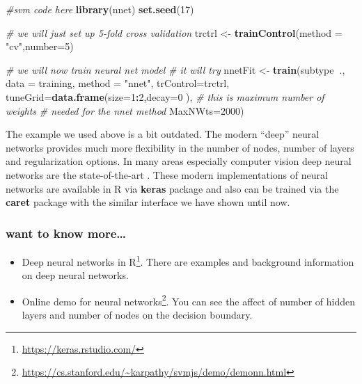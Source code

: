 \documentclass[12pt,]{krantz}
\newenvironment{Shaded}{\begin{snugshade}}{\end{snugshade}}
\newcommand{\CommentTok}[1]{\textcolor[rgb]{0.56,0.35,0.01}{\textit{#1}}}
\newcommand{\DataTypeTok}[1]{\textcolor[rgb]{0.13,0.29,0.53}{#1}}
\newcommand{\DecValTok}[1]{\textcolor[rgb]{0.00,0.00,0.81}{#1}}
\newcommand{\KeywordTok}[1]{\textcolor[rgb]{0.13,0.29,0.53}{\textbf{#1}}}
\newcommand{\NormalTok}[1]{#1}
\newcommand{\OperatorTok}[1]{\textcolor[rgb]{0.81,0.36,0.00}{\textbf{#1}}}
\newcommand{\StringTok}[1]{\textcolor[rgb]{0.31,0.60,0.02}{#1}}
\providecommand{\tightlist}{%
  \setlength{\itemsep}{0pt}\setlength{\parskip}{0pt}}
\renewcommand{\href}[2]{#2\footnote{\url{#1}}}
\begin{document}
\begin{Shaded}
\begin{Highlighting}[]
\CommentTok{#svm code here}
\KeywordTok{library}\NormalTok{(nnet)}
\KeywordTok{set.seed}\NormalTok{(}\DecValTok{17}\NormalTok{)}

\CommentTok{# we will just set up 5-fold cross validation}
\NormalTok{trctrl <-}\StringTok{ }\KeywordTok{trainControl}\NormalTok{(}\DataTypeTok{method =} \StringTok{"cv"}\NormalTok{,}\DataTypeTok{number=}\DecValTok{5}\NormalTok{)}

\CommentTok{# we will now train neural net model}
\CommentTok{# it will try}
\NormalTok{nnetFit <-}\StringTok{ }\KeywordTok{train}\NormalTok{(subtype}\OperatorTok{~}\NormalTok{., }\DataTypeTok{data =}\NormalTok{ training, }
                 \DataTypeTok{method =} \StringTok{"nnet"}\NormalTok{,}
                 \DataTypeTok{trControl=}\NormalTok{trctrl,}
                 \DataTypeTok{tuneGrid=}\KeywordTok{data.frame}\NormalTok{(}\DataTypeTok{size=}\DecValTok{1}\OperatorTok{:}\DecValTok{2}\NormalTok{,}\DataTypeTok{decay=}\DecValTok{0}
\NormalTok{                                      ),}
                 \CommentTok{# this is maximum number of weights}
                 \CommentTok{# needed for the nnet method}
                 \DataTypeTok{MaxNWts=}\DecValTok{2000}\NormalTok{) }
\end{Highlighting}
\end{Shaded}

The example we used above is a bit outdated. The modern ``deep'' neural networks provides much more flexibility in the number of nodes, number of layers and regularization options. In many areas especially computer vision deep neural networks are the state-of-the-art \citep{lecun2015deep}. These modern implementations of neural networks are available in R via \textbf{keras} package and also can be trained via the \textbf{caret} package with the similar interface we have shown until now.

\hypertarget{want-to-know-more-3}{%
\subsubsection{want to know more\ldots{}}\label{want-to-know-more-3}}

\begin{itemize}
\tightlist
\item
  \href{https://keras.rstudio.com/}{Deep neural networks in R}. There are examples and background information on deep neural networks.
\item
  \href{https://cs.stanford.edu/~karpathy/svmjs/demo/demonn.html}{Online demo for neural networks}. You can see the affect of number of hidden layers and number of nodes on the decision boundary.
\end{itemize}
\end{document}
